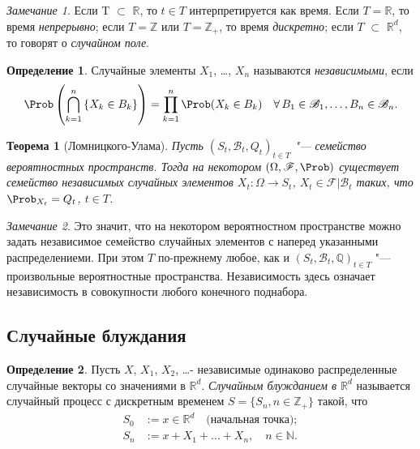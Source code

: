 \documentclass[a4paper]{article}
\theoremstyle{plain}
\newtheorem{thm}{Теорема}[section]
\theoremstyle{definition}
\newtheorem{defn}{Определение}[section]
\theoremstyle{remark}
\newtheorem*{rem}{Замечание}
\theoremstyle{nonumberplain}
\theoremstyle{nonumberplain}
\begin{document}
\begin{rem}
  Если T $\subset$ $\mathbb{R}$, то $t \in T$ интерпретируется как время. Если $T = \mathbb{R}$, то время \emph{непрерывно}; если $T = \mathbb{Z}$ или $T = \mathbb{Z}_{+}$, то время \emph{дискретно}; если $T$ $\subset$ $\mathbb{R}^{d}$, то говорят о \emph{случайном поле}.
\end{rem}

\begin{defn}
  Случайные элементы $X_{1}$, \ldots, $X_{n}$ называются \emph{независимыми}, если
  \begin{equation*}
    \Prob\left(\bigcap\limits_{k=1}^n \left\lbrace X_{k} \in  B_{k}\right\rbrace \right) = \prod\limits_{k=1}^n \Prob(X_{k} \in B_{k})\quad \forall\, B_{1} \in \mathscr{B}_{1}, \ldots, B_{n} \in \mathscr{B}_{n}.
  \end{equation*}
\end{defn}

\begin{thm}[Ломницкого-Улама]
  Пусть $(S_{t}, \mathscr{B}_{t}, Q_{t})_{t \in  T}$ "--- семейство вероятностных пространств. Тогда на некотором $(\Omega, \mathscr{F}, \Prob)$ существует семейство \emph{независимых} случайных элементов $X_{t}\colon \Omega \to S_{t}$, $X_{t} \in \mathscr{F}|\mathscr{B}_{t}$ таких, что $\Prob_{X_{t}} = Q_{t}$, $t \in T$.
\end{thm}

\begin{rem}
  \sloppy
  Это значит, что на некотором вероятностном пространстве можно задать независимое семейство случайных элементов с наперед указанными распределениеми. При этом $T$ по-прежнему любое, как и $(S_{t}, \mathscr{B}_{t}, \mathbb{Q})_{t \in T}$ "--- произвольные вероятностные пространства. Независимость здесь означает независимость в совокупности любого конечного поднабора.
\end{rem}

\subsection{Случайные блуждания}

\begin{defn}
  Пусть $X$, $X_{1}$, $X_{2}$, \ldots - независимые одинаково распределенные случайные векторы со значениями в $\mathbb{R}^{d}$. \emph{Случайным блужданием в $\mathbb{R}^{d}$} называется случайный процесс с дискретным временем $S = \lbrace S_{n}, n \in \mathbb{Z}_{+}\rbrace$ такой, что
  \begin{align*}
    S_{0} &:= x \in \mathbb{R}^{d} \quad\text{(начальная точка)};\\
    S_{n} &:= x + X_{1} + \ldots + X_{n}, \quad n \in \mathbb{N}.
  \end{align*}
\end{defn}
\end{document}

